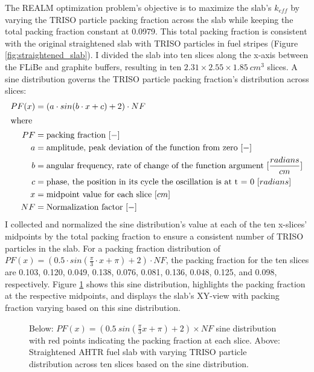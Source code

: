 The \gls{REALM} optimization problem's objective is to maximize the slab's 
$k_{eff}$ by varying the \gls{TRISO} particle packing fraction across the slab
while keeping the total packing fraction constant at 0.0979. 
This total packing fraction is consistent with the original straightened slab with 
TRISO particles in fuel stripes (Figure \ref{fig:straightened_slab}). 
I divided the slab into ten slices along the x-axis between the \gls{FLiBe} and 
graphite buffers, resulting in ten $2.31 \times 2.55 \times 1.85\ cm^3$ slices. 
A sine distribution governs the \gls{TRISO} particle packing fraction's 
distribution across slices:
\begin{align}
    PF(x) &= \left(a\cdot sin(b\cdot x + c) + 2\right) \cdot NF\\
    \intertext{where}
    PF &= \mbox{packing fraction } [-] \nonumber \\ 
    a &= \mbox{amplitude, peak deviation of the function from zero } [-] \nonumber \\
    b &= \mbox{angular frequency, rate of change of the function argument } [\frac{radians}{cm}] \nonumber \\
    c &= \mbox{phase, the position in its cycle the oscillation is at t = 0 } [radians]\nonumber \\
    x &= \mbox{midpoint value for each slice } [cm]\nonumber \\
    NF &= \mbox{Normalization factor } [-]\nonumber
\end{align}
I collected and normalized the sine distribution's value at each of the ten 
x-slices' midpoints by the total packing fraction to ensure a consistent number 
of \gls{TRISO} particles in the slab.
For a packing fraction distribution of 
$PF(x) = \left(0.5\cdot sin(\frac{\pi}{3}\cdot x + \pi) + 2\right)  \cdot NF$, 
the packing fraction for the ten slices are 0.103, 0.120, 0.049, 0.138, 
0.076, 0.081, 0.136, 0.048, 0.125, and 0.098, respectively. 
Figure \ref{fig:triso_distribution} shows this sine distribution, highlights 
the packing fraction at the respective midpoints, and displays the slab's XY-view
with packing fraction varying based on this sine distribution. 
\begin{figure}[]
    \centering
    \caption{Below: $PF(x) = (0.5\ sin(\frac{\pi}{3}x + \pi) + 2)  \times NF$ 
    sine distribution with red points indicating the packing fraction at each slice. 
    Above: Straightened \acrfull{AHTR} fuel slab with varying \gls{TRISO} particle 
    distribution across ten slices based on the sine distribution. }
    \label{fig:triso_distribution}
\end{figure}

